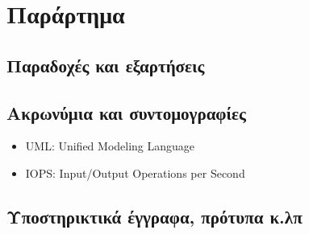 \section{Παράρτημα}
\subsection{Παραδοχές και εξαρτήσεις}
\subsection{Ακρωνύμια και συντομογραφίες}
\begin{itemize}
    \item UML: Unified Modeling Language
    \item IOPS: Input/Output Operations per Second
\end{itemize}
\subsection{Υποστηρικτικά έγγραφα, πρότυπα κ.λπ}